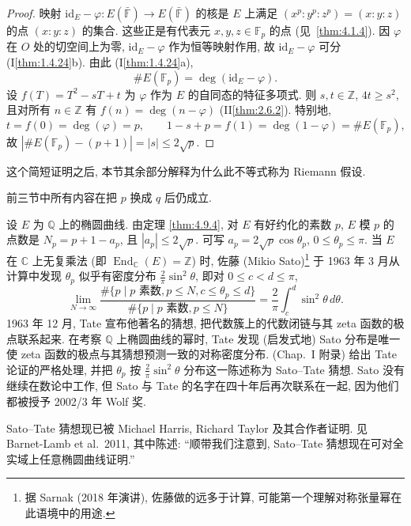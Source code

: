 \begin{proof}
映射 $\mathrm{id}_E - \varphi\colon E(\bar{\mathbb{F}})\to E(\bar{\mathbb{F}})$ 的核是 $E$ 上满足 $(x^p:y^p:z^p) = (x:y:z)$ 的点 $(x:y:z)$ 的集合. 这些正是有代表元 $x, y, z\in\mathbb{F}_p$ 的点 (见~\ref{thm:4.1.4}). 因 $\varphi$ 在 $O$ 处的切空间上为零, $\mathrm{id}_E - \varphi$ 作为恒等映射作用, 故 $\mathrm{id}_E - \varphi$ 可分 (I\ref{thm:1.4.24}b). 由此 (I\ref{thm:1.4.24}a),
\[
\#E(\mathbb{F}_p) = \deg(\mathrm{id}_E - \varphi).
\]
设 $f(T) = T^2 - sT + t$ 为 $\varphi$ 作为 $E$ 的自同态的特征多项式. 则 $s, t\in\mathbb{Z}$, $4t\ge s^2$, 且对所有 $n\in\mathbb{Z}$ 有 $f(n) = \deg(n - \varphi)$ (II\ref{thm:2.6.2}). 特别地,
\[
t = f(0) = \deg(\varphi) = p, \qquad 1 - s + p = f(1) = \deg(1 - \varphi) = \#E(\mathbb{F}_p),
\]
故 $|\#E(\mathbb{F}_p) - (p+1)| = |s|\le 2\sqrt{p}$.
\end{proof}

这个简短证明之后, 本节其余部分解释为什么此不等式称为 Riemann 假设.

前三节中所有内容在把 $p$ 换成 $q$ 后仍成立.

\begin{aside} \label{thm:4.9.5} 
设 $E$ 为 $\mathbb{Q}$ 上的椭圆曲线. 由定理 \ref{thm:4.9.4}, 对 $E$ 有好约化的素数 $p$, $E$ 模 $p$ 的点数是 $N_p = p + 1 - a_p$, 且 $|a_p|\le 2\sqrt{p}$. 可写 $a_p = 2\sqrt{p}\cos\theta_p$, $0\le\theta_p\le\pi$. 当 $E$ 在 $\mathbb{C}$ 上无复乘法 (即 $\operatorname{End}_{\mathbb{C}}(E) = \mathbb{Z}$) 时, 佐藤 (Mikio Sato)\footnote{据 Sarnak (2018 年演讲), 佐藤做的远多于计算, 可能第一个理解对称张量幂在此语境中的用途.} 于 1963 年 3 月从计算中发现 $\theta_p$ 似乎有密度分布 $\frac{2}{\pi}\sin^2\theta$, 即对 $0\le c < d\le\pi$,
\[
\lim_{N\to\infty}\frac{\#\{p \mid p \text{ 素数}, p\le N, c\le\theta_p\le d\}}{\#\{p \mid p \text{ 素数}, p\le N\}} = \frac{2}{\pi}\int_c^d\sin^2\theta\,d\theta.
\]
1963 年 12 月, Tate 宣布他著名的猜想, 把代数簇上的代数闭链与其 zeta 函数的极点联系起来. 在考察 $\mathbb{Q}$ 上椭圆曲线的幂时, Tate 发现 (启发式地) Sato 分布是唯一使 zeta 函数的极点与其猜想预测一致的对称密度分布. \cite{serre1968} (Chap.~I 附录) 给出 Tate 论证的严格处理, 并把 $\theta_p$ 按 $\frac{2}{\pi}\sin^2\theta$ 分布这一陈述称为 Sato--Tate 猜想. Sato 没有继续在数论中工作, 但 Sato 与 Tate 的名字在四十年后再次联系在一起, 因为他们都被授予 2002/3 年 Wolf 奖.

Sato--Tate 猜想现已被 Michael Harris, Richard Taylor 及其合作者证明. 见 Barnet-Lamb et al.\ 2011, 其中陈述: ``顺带我们注意到, Sato--Tate 猜想现在可对全实域上任意椭圆曲线证明.''
\end{aside}

